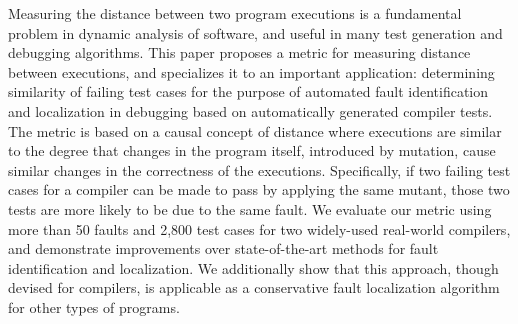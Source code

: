 Measuring the distance between two program executions is a fundamental problem in dynamic analysis of software, and useful in many test generation and debugging algorithms.  This paper proposes a metric for measuring distance between executions, and specializes it to an important application: determining similarity of failing test cases for the purpose of automated fault identification and localization in debugging based on automatically generated compiler tests.  The metric is based on a causal concept of distance where executions are similar to the degree that changes in the program itself, introduced by mutation, cause similar changes in the correctness of the executions.  Specifically, if two failing test cases for a compiler can be made to pass by applying the same mutant, those two tests are more likely to be due to the same fault.  We evaluate our metric using more than 50 faults and 2,800 test cases for two widely-used real-world compilers, and demonstrate improvements over state-of-the-art methods for fault identification and localization.  We additionally show that this approach, though devised for compilers, is applicable as a conservative fault localization algorithm for other types of programs.